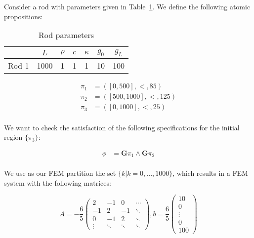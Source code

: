 \documentclass{article}
\newcommand{\Always}{\mathbf{G}}
\begin{document}
Consider a rod with parameters given in Table~\ref{tab:ex_pars}. We define
the following atomic propositions: 

\begin{table}
\centering
\begin{tabular}{|c|c|c|c|c|c|c|}
    \hline
    & $L$ & $\rho$ & $c$ & $\kappa$ & $g_0$ & $g_L$ \\
    \hline
    Rod 1 & 1000 & 1 & 1 & 1 & 10 & 100 \\
    \hline
\end{tabular}
\caption{Rod parameters}
\label{tab:ex_pars}
\end{table}

\begin{equation}
    \begin{aligned}
        \pi_1 &= ([0, 500], <, 85) \\
        \pi_2 &= ([500, 1000], <, 125) \\
        \pi_3 &= ([0, 1000], <, 25) \\
    \end{aligned}
\end{equation}

We want to check the satisfaction of the following specifications for the
initial region $\{\pi_3\}$:

\begin{equation}
\label{eq:ex_specs}
    \begin{aligned}
        \phi &= \Always \pi_1 \wedge \Always \pi_2 \\ 
    \end{aligned}
\end{equation}

We use as our FEM partition the set $\{k | k = 0,...,1000\}$, which results
in a FEM system with the following matrices:

\begin{equation}
    A = - \frac{6} {5} \begin{pmatrix}
        2 & -1  & 0 & \cdots \\ 
        -1 & 2 & -1 & \ddots \\ 
        0 & -1 & 2 & \ddots \\
        \vdots & \ddots & \ddots & \ddots 
    \end{pmatrix},
    b = \frac{6} {5}\begin{pmatrix}
        10 \\
        0 \\
        \vdots \\
        0 \\
        100
    \end{pmatrix}
\end{equation}
\end{document}
